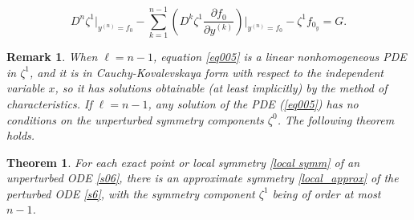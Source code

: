 \documentclass[11pt,letter,subeqn]{article}
\newtheorem{theorem}{Theorem}[section]
\newtheorem{remark}{Remark}[section]
\begin{document}
   \begin{equation}\label{eq005}
    D^n \zeta^{1}\bigg|_{y^{(n)}=f_0}-\sum_{k=1}^{n-1}\left(D^{k}\zeta^{1}\frac{\partial f_0}{\partial y^{(k)}}\right) \bigg|_{y^{(n)}=f_0}- \zeta^1 f_{0_y}=G.
   \end{equation}
   \begin{remark}
     When $\ell=n-1$, equation \eqref{eq005} is a linear nonhomogeneous PDE in $\zeta^1$, and it is in \textrm{{Cauchy-Kovalevskaya form}} with respect to the independent variable $x$, so it has solutions obtainable (at least implicitly) by the method of characteristics. If $\ell=n-1$, any solution of the PDE (\ref{eq005}) has no conditions on the unperturbed symmetry components $\zeta^0$. The following theorem holds.
   \end{remark}
   \begin{theorem}\label{h.o.approx}
     For each exact point or local symmetry \eqref{local symm} of an unperturbed ODE \eqref{s06}, there is an approximate symmetry \eqref{local_approx} of the perturbed ODE \eqref{s6}, with the symmetry component $\zeta^1$ being of order at most $n-1$.
   \end{theorem}
\end{document}
